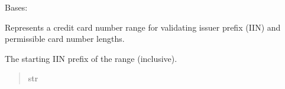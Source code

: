 \documentclass[letterpaper,10pt,english]{sphinxmanual}
\begin{document}
\begin{fulllineitems}
\begin{fulllineitems}
\label{\detokenize{apache_commons_validator_python.routines:apache_commons_validator_python.routines.credit_card_validator.CreditCardValidator.CreditCardRange}}
\pysigstartsignatures
{}
\pysigstopsignatures
\sphinxAtStartPar
Bases: 

\sphinxAtStartPar
Represents a credit card number range for validating issuer prefix (IIN) and
permissible card number lengths.

\begin{fulllineitems}
\label{\detokenize{apache_commons_validator_python.routines:apache_commons_validator_python.routines.credit_card_validator.CreditCardValidator.CreditCardRange.low}}
\pysigstartsignatures
{}
\pysigstopsignatures
\sphinxAtStartPar
The starting IIN prefix of the range (inclusive).
\begin{quote}\begin{description}
\sphinxAtStartPar
str

\end{description}\end{quote}

\end{fulllineitems}


\end{fulllineitems}
\end{fulllineitems}
\end{document}
